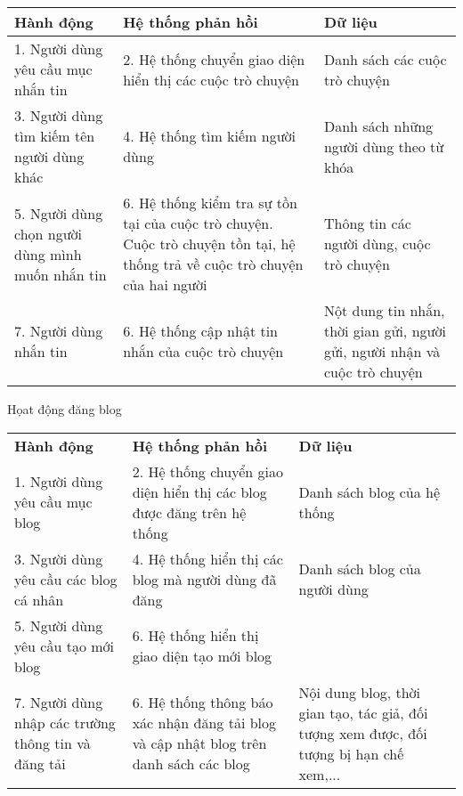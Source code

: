 \documentclass[./../main_file.tex]{subfiles}
\begin{document}
\begin{longtable}{|p{}|p{}|p{}|}
		\hline
		\textbf{Hành động}                             & \textbf{Hệ thống phản hồi}                                & \textbf{Dữ liệu}                       \\ \hline
		1. Người dùng yêu cầu mục nhắn tin & 2. Hệ thống chuyển giao diện hiển thị các cuộc trò chuyện & Danh sách các cuộc trò chuyện          \\ \hline
		3. Người dùng tìm kiếm tên người dùng khác     & 4. Hệ thống tìm kiếm người dùng        & Danh sách những người dùng theo từ khóa \\ \hline
		5. Người dùng chọn người dùng mình muốn nhắn tin         & 6. Hệ thống kiểm tra sự tồn tại của cuộc trò chuyện. Cuộc trò chuyện tồn tại, hệ thống trả về cuộc trò chuyện của hai người & Thông tin các người dùng, cuộc trò chuyện \\ \hline
		7. Người dùng nhắn tin & 6. Hệ thống cập nhật tin nhắn của cuộc trò chuyện & Nột dung tin nhắn, thời gian gửi, người gửi, người nhận và cuộc trò chuyện\\ \hline
\end{longtable}
Họat động đăng blog
\begin{longtable}{|p{}|p{}|p{}|}
		\hline
		\textbf{Hành động} & \textbf{Hệ thống phản hồi} & \textbf{Dữ liệu} \\
		1. Người dùng yêu cầu mục blog & 2. Hệ thống chuyển giao diện hiển thị các blog được đăng trên hệ thống & Danh sách blog của hệ thống \\ \hline
		3. Người dùng yêu cầu các blog cá nhân & 4. Hệ thống hiển thị các blog mà người dùng đã đăng & Danh sách blog của người dùng \\ \hline
		5. Người dùng yêu cầu tạo mới blog & 6. Hệ thống hiển thị giao diện tạo mới blog &  \\ \hline
	7. Người dùng nhập các trường thông tin và đăng tải & 6. Hệ thống thông báo xác nhận đăng tải blog và cập nhật blog trên danh sách các blog & Nội dung blog, thời gian tạo, tác giả, đối tượng xem được, đối tượng bị hạn chế xem,... \\ \hline

\end{longtable}
\end{document}
